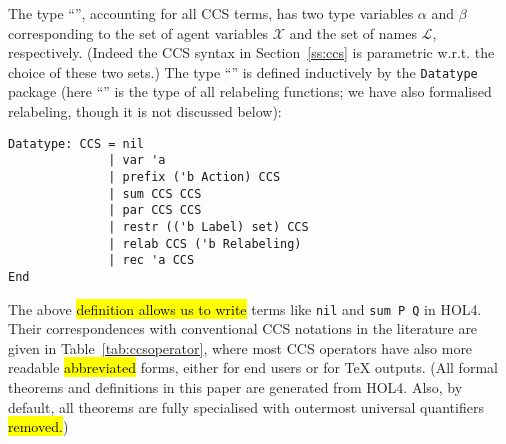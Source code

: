 The type ``'', accounting for all CCS terms,
has two type variables $\alpha$ and $\beta$ corresponding
to the set of agent variables $\mathscr{X}$
and the set of names $\mathscr{L}$,
respectively. (Indeed the CCS syntax in Section~\ref{ss:ccs} is parametric
w.r.t. the choice of these two sets.)
%
The type ``'' is defined inductively by the
\texttt{Datatype} package
(here ``'' is the type of all relabeling
  functions; we have also formalised relabeling, though it is not
  discussed below):
\begin{lstlisting}
Datatype: CCS = nil
              | var 'a
              | prefix ('b Action) CCS
              | sum CCS CCS
              | par CCS CCS
              | restr (('b Label) set) CCS
              | relab CCS ('b Relabeling)
              | rec 'a CCS
End
\end{lstlisting}
The above \hl{definition allows us to write} terms like \texttt{nil} and
\texttt{sum P Q} in HOL4. Their correspondences with conventional CCS notations
in the literature are given in Table~\ref{tab:ccsoperator}, where
most CCS operators have also more readable \hl{abbreviated} forms,
either for end users or for \TeX{} outputs. (All
  formal theorems and definitions in this paper
  are generated from HOL4. Also, by default, all theorems are fully
  specialised with outermost universal quantifiers \hl{removed.})

